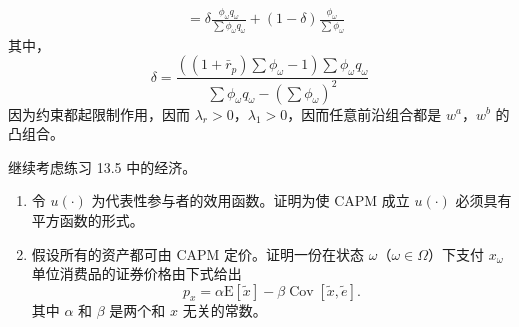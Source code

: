 \begin{solution}
\begin{enumerate}[label=(\alph*)]
\begin{itemize}
\[\begin{aligned}
                &=\delta\frac{\phi_{\omega}q_{\omega}}{\sum\phi_{\omega}q_{\omega}}+(1-\delta)\frac{\phi_{\omega}}{\sum\phi_{\omega}}
            \end{aligned}
        \]
        其中，
        \[
            \delta=\frac{((1+\bar{r}_{p})\sum\phi_{\omega}-1)\sum\phi_{\omega}q_{\omega}}{\sum\phi_{\omega}q_{\omega}-(\sum\phi_{\omega})^{2}}
        \]
        因为约束都起限制作用，因而 $\lambda_{r}>0$，$\lambda_{1}>0$，因而任意前沿组合都是 $w^{a}$，$w^{b}$ 的凸组合。
    \end{itemize}
\end{enumerate}
\end{solution}

\begin{problem}
 继续考虑练习 13.5 中的经济。
\begin{enumerate}[label=(\alph*)]
    \item 令 $u(\cdot)$ 为代表性参与者的效用函数。证明为使 CAPM 成立 $u(\cdot)$ 必须具有平方函数的形式。
    \item 假设所有的资产都可由 CAPM 定价。证明一份在状态 $\omega$（$\omega\in\Omega$）下支付 $x_{\omega}$ 单位消费品的证券价格由下式给出
    \[
        p_{x}=\alpha\mathrm{E}[\tilde{x}]-\beta\operatorname{Cov}[\tilde{x},\tilde{e}].
    \]
    其中 $\alpha$ 和 $\beta$ 是两个和 $x$ 无关的常数。
\end{enumerate}
\end{problem}
